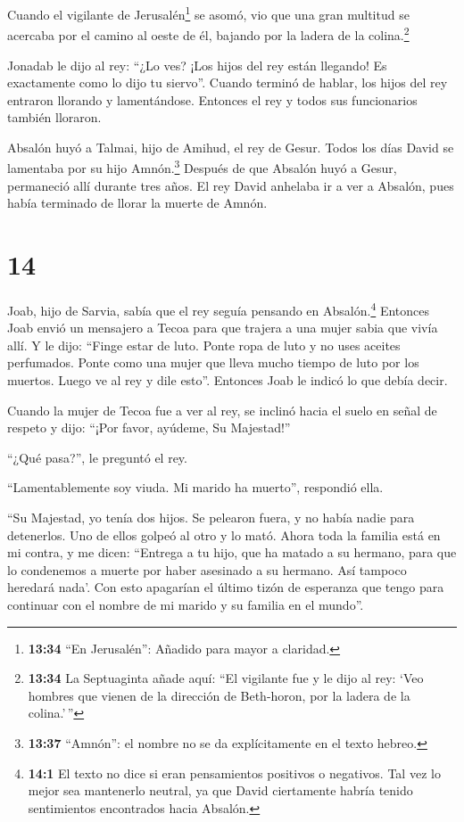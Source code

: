 Cuando el vigilante de Jerusalén\footnote{\textbf{13:34} ``En
  Jerusalén'': Añadido para mayor a claridad.} se asomó, vio que una
gran multitud se acercaba por el camino al oeste de él, bajando por la
ladera de la colina.\footnote{\textbf{13:34} La Septuaginta añade aquí:
  ``El vigilante fue y le dijo al rey: `Veo hombres que vienen de la
  dirección de Beth-horon, por la ladera de la colina.'\,''}

 Jonadab le dijo al rey: ``¿Lo ves? ¡Los hijos del rey
están llegando! Es exactamente como lo dijo tu siervo''. 
Cuando terminó de hablar, los hijos del rey entraron llorando y
lamentándose. Entonces el rey y todos sus funcionarios también lloraron.

 Absalón huyó a Talmai, hijo de Amihud, el rey de Gesur.
Todos los días David se lamentaba por su hijo Amnón.\footnote{\textbf{13:37}
  ``Amnón'': el nombre no se da explícitamente en el texto hebreo.}
 Después de que Absalón huyó a Gesur, permaneció allí
durante tres años.  El rey David anhelaba ir a ver a
Absalón, pues había terminado de llorar la muerte de Amnón.

\hypertarget{section-13}{%
\section{14}\label{section-13}}

 Joab, hijo de Sarvia, sabía que el rey seguía pensando en
Absalón.\footnote{\textbf{14:1} El texto no dice si eran pensamientos
  positivos o negativos. Tal vez lo mejor sea mantenerlo neutral, ya que
  David ciertamente habría tenido sentimientos encontrados hacia
  Absalón.}  Entonces Joab envió un mensajero a Tecoa para
que trajera a una mujer sabia que vivía allí. Y le dijo: ``Finge estar
de luto. Ponte ropa de luto y no uses aceites perfumados. Ponte como una
mujer que lleva mucho tiempo de luto por los muertos.  Luego
ve al rey y dile esto''. Entonces Joab le indicó lo que debía decir.

 Cuando la mujer de Tecoa fue a ver al rey, se inclinó hacia
el suelo en señal de respeto y dijo: ``¡Por favor, ayúdeme, Su
Majestad!''

 ``¿Qué pasa?'', le preguntó el rey.

``Lamentablemente soy viuda. Mi marido ha muerto'', respondió ella.

 ``Su Majestad, yo tenía dos hijos. Se pelearon fuera, y no
había nadie para detenerlos. Uno de ellos golpeó al otro y lo mató.
 Ahora toda la familia está en mi contra, y me dicen:
``Entrega a tu hijo, que ha matado a su hermano, para que lo condenemos
a muerte por haber asesinado a su hermano. Así tampoco heredará nada'.
Con esto apagarían el último tizón de esperanza que tengo para continuar
con el nombre de mi marido y su familia en el mundo''.


